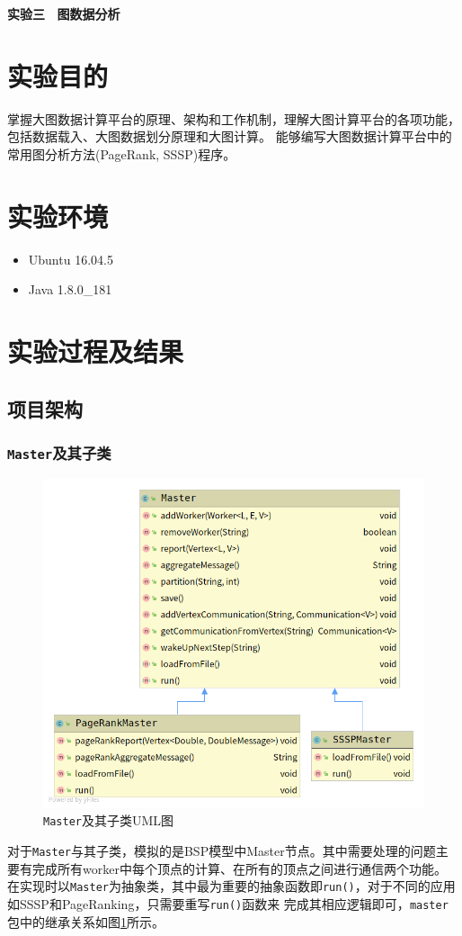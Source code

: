 \documentclass{ML}
\begin{document}
\maketitle

\tableofcontents
\newpage

\begin{center}
    \textbf{ 实验三 \  图数据分析}
\end{center}

\section{实验目的}
掌握大图数据计算平台的原理、架构和工作机制，理解大图计算平台的各项功能，包括数据载入、大图数据划分原理和大图计算。
能够编写大图数据计算平台中的常用图分析方法(PageRank, SSSP)程序。
\section{实验环境}
\begin{itemize}
\item Ubuntu 16.04.5
\item Java 1.8.0\_181
\end{itemize}
\section{实验过程及结果}
\subsection{项目架构}
\subsubsection{\texttt{Master}及其子类}
\begin{figure}[htb]
    \centering
    \includegraphics[width=0.6\linewidth]{media/master.png}
    \caption{\texttt{Master}及其子类UML图}\label{fig:master}
\end{figure}
对于\texttt{Master}与其子类，模拟的是BSP模型中Master节点。其中需要处理的问题主要有完成所有worker中每个顶点的计算、在所有的顶点之间进行通信两个功能。
在实现时以\texttt{Master}为抽象类，其中最为重要的抽象函数即\texttt{run()}，对于不同的应用如SSSP和PageRanking，只需要重写\texttt{run()}函数来
完成其相应逻辑即可，\texttt{master}包中的继承关系如图\ref{fig:master}所示。
\end{document}
